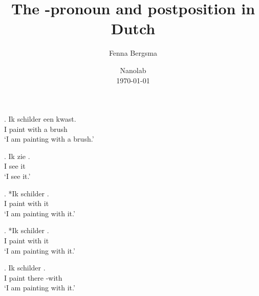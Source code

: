 \documentclass[xcolor=dvipsnames,10pt]{beamer}
\title{The \tsc{r}-pronoun and postposition \tit{waar-mee} in Dutch}
\author{Fenna Bergsma}
\date{Nanolab\\ \today}
\institute{Goethe-Universität Frankfurt}
\begin{document}
\begin{frame}
	\titlepage

\end{frame}


\begin{frame}

\exg. Ik schilder  een kwast.\\
 I paint with a brush\\
 `I am painting with a brush.'\label{ex:metdp}

 \pause

\exg. Ik zie .\\
 I see it\\
 `I see it.'\label{ex:tverb}

\pause

\exg. *Ik schilder  .\\
 I paint with it\\
 `I am painting with it.'

\end{frame}


\begin{frame}

\exg. *Ik schilder  .\\
 I paint with it\\
 `I am painting with it.'\label{ex:neemett}

\pause

\exg. Ik schilder  .\\
 I paint there -with\\
 `I am painting with it.'\label{ex:jarmee}

\end{frame}


\begin{frame}


\end{frame}
\end{document}
